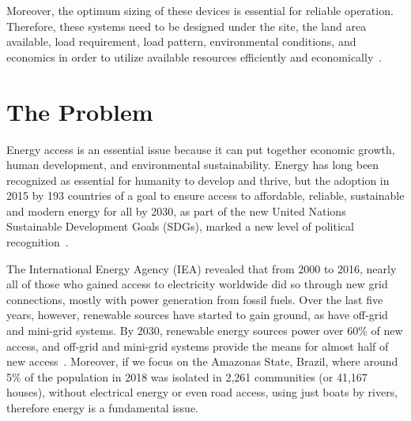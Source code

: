 Moreover, the optimum sizing of these devices is essential for reliable operation. Therefore, these systems need to be designed under the site, the land area available, load requirement, load pattern, environmental conditions, and economics in order to utilize available resources efficiently and economically~\cite{Rawat}.

\section{The Problem}
%
%

Energy access is an essential issue because it can put together economic growth, human development, and environmental sustainability. Energy has long been recognized as essential for humanity to develop and thrive, but the adoption in 2015 by 193 countries of a goal to ensure access to affordable, reliable, sustainable and modern energy for all by 2030, as part of the new United Nations Sustainable Development Goals (SDGs), marked a new level of political recognition~\cite{IEAweo2018}.

The International Energy Agency (IEA) revealed that from 2000 to 2016, nearly all of those who gained access to electricity worldwide did so through new grid connections, mostly with power generation from fossil fuels. Over the last five years, however, renewable sources have started to gain ground, as have off-grid and mini-grid systems. By 2030, renewable energy sources power over 60\% of new access, and off-grid and mini-grid systems provide the means for almost half of new access~\cite{IEAweo2018}. Moreover, if we focus on the Amazonas State, Brazil, where around 5\% of the population in 2018 was isolated in 2,261 communities (or 41,167 houses), without electrical energy or even road access, using just boats by rivers, therefore energy is a fundamental issue. 

